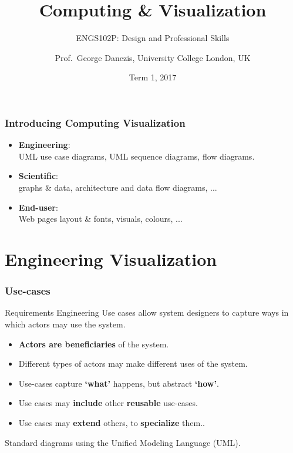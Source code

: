 \documentclass{beamer} %
\author{Prof.\ George Danezis, University College London, UK}
\title{Computing \& Visualization}
\subtitle{ENGS102P: Design and Professional Skills }
\date{Term 1, 2017}
\newcommand\emc[1]{\textcolor{brightblue}{\textbf{#1}}}
\begin{document}
\nobibliography*


\frame{
\titlepage
}

\begin{frame}
\frametitle{Introducing Computing Visualization}

\begin{itemize}
  \item \emc{Engineering}: \\ UML use case diagrams, UML sequence diagrams, flow diagrams.
  \item \emc{Scientific}: \\ graphs \& data, architecture and data flow diagrams, ...   
  \item \emc{End-user}: \\ Web pages layout \& fonts, visuals, colours, ...
\end{itemize}

\end{frame}

\section{Engineering Visualization}


\begin{frame}
\frametitle{Use-cases}

\begin{block}{Requirements Engineering}
Use cases allow system designers to capture ways in which actors may use the system. 
\end{block}

\begin{itemize}
  \item \emc{Actors are beneficiaries} of the system.
  \item Different types of actors may make different uses of the system.
  \item Use-cases capture \emc{`what'} happens, but abstract \emc{`how'}.
  \item Use cases may \emc{include} other \emc{reusable} use-cases.
  \item Use cases may \emc{extend} others, to \emc{specialize} them..
\end{itemize}

\vspace{3mm}
Standard diagrams using the Unified Modeling Language (UML).

\end{frame}
\end{document}
